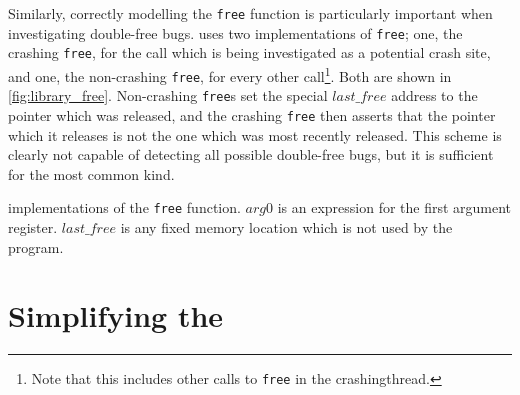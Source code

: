 Similarly, correctly modelling the \texttt{free} function is
particularly important when investigating double-free bugs.
{\Technique} uses two implementations of \texttt{free}; one, the
crashing \texttt{free}, for the call which is being investigated as a
potential crash site, and one, the non-crashing \texttt{free}, for
every other call\footnote{Note that this includes other calls to
  \texttt{free} in the \gls{crashingthread}.}.  Both are shown in
\autoref{fig:library_free}.  Non-crashing \texttt{free}s set the
special $\mathit{last\_free}$ address to the pointer which was
released, and the crashing \texttt{free} then asserts that the pointer
which it releases is not the one which was most recently released.
This scheme is clearly not capable of detecting all possible
double-free bugs, but it is sufficient for the most common kind.

\begin{sanefig}
  \centerline{
  }
  \vspace{-12pt}
  \caption{{\STateMachine} implementations of the \texttt{free}
    function. $\mathit{arg0}$ is an expression for the first argument
    register.  $\mathit{last\_free}$ is any fixed memory location
    which is not used by the program.}
  \label{fig:library_free}
\end{sanefig}

\section{Simplifying the {\StateMachine}}
\label{sect:derive:simplify_sm}

